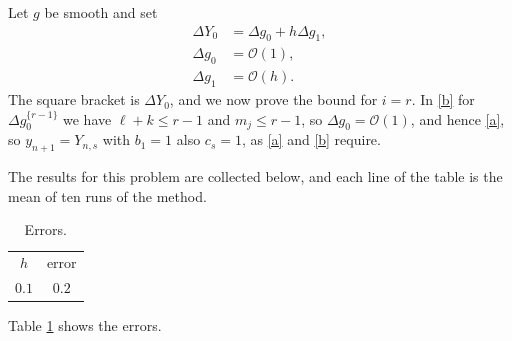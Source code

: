 \documentclass[11pt]{article}
\begin{document}
Let $g$ be smooth and set
\begin{subequations}
\begin{align}
\Delta Y_0 &= \Delta g_0 + h \Delta g_1, \label{a}\\
\Delta g_0 &= \mathcal{O}(1), \label{b}\\
\Delta g_1 &= \mathcal{O}(h). \label{c}
\end{align}
\end{subequations}
\newpage
The square bracket is $\Delta Y_0$, and we now prove the bound for $i = r$. In\linebreak
\eqref{b} for $\Delta g_0^{\{r-1\}}$ we have $\ell + k \le r - 1$ and $m_j \le r - 1$, so $\Delta g_0 = \mathcal{O}(1)$, and hence\linebreak
\eqref{a}, so $y_{n+1} = Y_{n,s}$ with $b_1 = 1$ also $c_s = 1$, as \eqref{a} and \eqref{b} require.

The results for this problem are collected below, and each line of the table is the mean of ten runs of the method.
\begin{table}[h]
\centering
\caption{Errors.}\label{t}
\begin{tabular}{cc} $h$ & error \\ $0.1$ & $0.2$ \end{tabular}
\end{table}

Table \ref{t} shows the errors.
\end{document}
